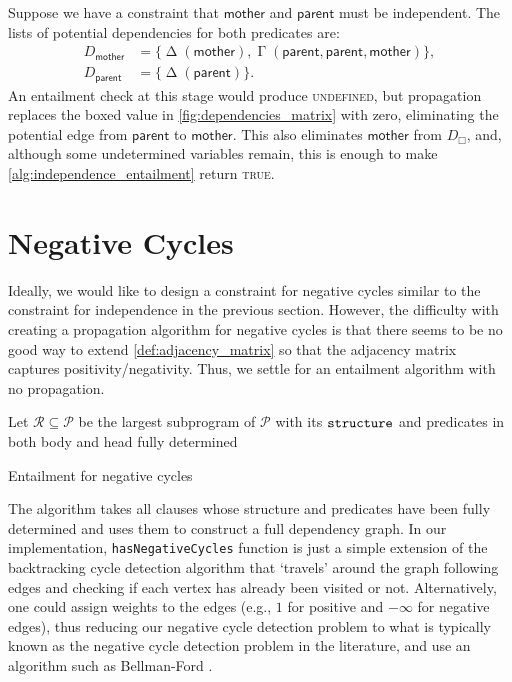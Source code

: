 \documentclass[runningheads]{llncs}
\newcommand{\variable}[1]{\texttt{\textup{#1}}}
\DeclareMathOperator{\Determined}{\Delta}
\DeclareMathOperator{\AlmostDetermined}{\Gamma}
\begin{document}
\begin{example}
  Suppose we have a constraint that $\mathsf{mother}$ and $\mathsf{parent}$ must
  be independent. The lists of potential dependencies for both predicates are:
  \begin{align*}
    D_{\mathsf{mother}} &= \{ \Determined(\mathsf{mother}), \AlmostDetermined(\mathsf{parent}, \mathsf{parent}, \mathsf{mother}) \}, \\
    D_{\mathsf{parent}} &= \{ \Determined(\mathsf{parent}) \}.
  \end{align*}
  An entailment check at this stage would produce \textsc{undefined}, but
  propagation replaces the boxed value in \cref{fig:dependencies_matrix} with
  zero, eliminating the potential edge from $\mathsf{parent}$ to
  $\mathsf{mother}$. This also eliminates $\mathsf{mother}$ from $D_\Box$, and,
  although some undetermined variables remain, this is enough to make
  \cref{alg:independence_entailment} return \textsc{true}.
\end{example}

\section{Negative Cycles} \label{sec:cycles}

Ideally, we would like to design a constraint for negative cycles similar to the
constraint for independence in the previous section. However, the difficulty
with creating a propagation algorithm for negative cycles is that there seems to
be no good way to extend \cref{def:adjacency_matrix} so that the adjacency
matrix captures positivity/negativity. Thus, we settle for an entailment
algorithm with no propagation.

\begin{algorithm}
  Let $\mathscr{R} \subseteq \mathscr{P}$ be the largest subprogram of
  $\mathscr{P}$ with its $\variable{structure}$ and predicates in both body
  and head fully determined\footnotemark\;
  \;
  \caption{Entailment for negative cycles}
  \label{alg:negative_cycles}
\end{algorithm}

The algorithm takes all clauses whose structure and predicates have been fully
determined and uses them to construct a full dependency graph. In our
implementation, \texttt{hasNegativeCycles} function is just a simple extension
of the backtracking cycle detection algorithm that `travels' around the graph
following edges and checking if each vertex has already been visited or not.
Alternatively, one could assign weights to the edges (e.g., $1$ for positive
and $-\infty$ for negative edges), thus reducing our negative cycle detection
problem to what is typically known as the negative cycle detection problem in
the literature, and use an algorithm such as Bellman-Ford
\cite{shimbel1954structure}.
\end{document}
